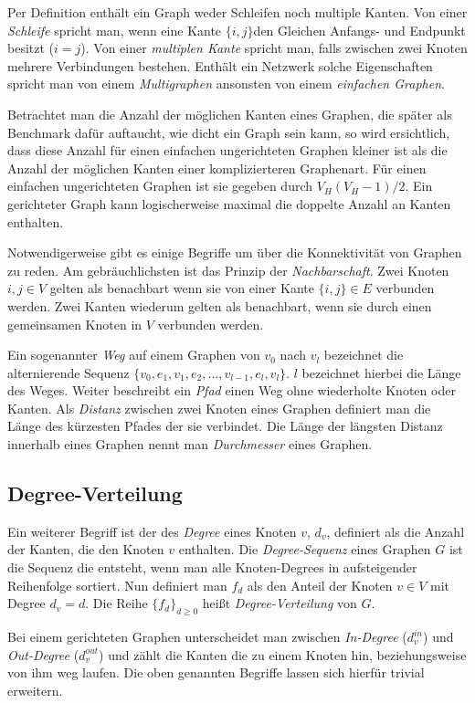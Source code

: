 \documentclass[a4paper,ngerman,oneside,titlepage,bibliography=totoc,11pt]{scrreprt}
\begin{document}
Per Definition enthält ein Graph weder Schleifen noch multiple Kanten. Von einer \emph{Schleife} spricht man, wenn eine Kante $\{i,j\}$den Gleichen Anfangs- und Endpunkt besitzt ($i = j$). Von einer \emph{multiplen Kante} spricht man, falls zwischen zwei Knoten mehrere Verbindungen bestehen. Enthält ein Netzwerk solche Eigenschaften spricht man von einem \emph{Multigraphen} ansonsten von einem \emph{einfachen Graphen}.

Betrachtet man die Anzahl der möglichen Kanten eines Graphen, die später als Benchmark dafür auftaucht, wie dicht ein Graph sein kann, so wird ersichtlich, dass diese Anzahl für einen einfachen ungerichteten Graphen kleiner ist als die Anzahl der möglichen Kanten einer komplizierteren Graphenart. Für einen einfachen ungerichteten Graphen ist sie gegeben durch $V_H(V_H-1)/2$. Ein gerichteter Graph kann logischerweise maximal die doppelte Anzahl an Kanten enthalten.

Notwendigerweise gibt es einige Begriffe um über die Konnektivität von Graphen zu reden. Am gebräuchlichsten ist das Prinzip der \emph{Nachbarschaft}. Zwei Knoten $ i,j \in V$ gelten als benachbart wenn sie von einer Kante $\{i,j\} \in E$ verbunden werden. Zwei Kanten wiederum gelten als benachbart, wenn sie durch einen gemeinsamen Knoten in $V$ verbunden werden.

Ein sogenannter \emph{Weg} auf einem Graphen von $v_0$ nach $v_l$ bezeichnet die alternierende Sequenz $\{v_0, e_1, v_1, e_2, ..., v_{l-1}, e_l, v_l\}$. $l$ bezeichnet hierbei die Länge des Weges. Weiter beschreibt ein \emph{Pfad} einen Weg ohne wiederholte Knoten oder Kanten. Als \emph{Distanz} zwischen zwei Knoten eines Graphen definiert man die Länge des kürzesten Pfades der sie verbindet. Die Länge der längsten Distanz innerhalb eines Graphen nennt man \emph{Durchmesser} eines Graphen.

\subsection{Degree-Verteilung}
Ein weiterer Begriff ist der des \emph{Degree} eines Knoten $v$, $d_v$, definiert als die Anzahl der Kanten, die den Knoten $v$ enthalten. Die \emph{Degree-Sequenz} eines Graphen $G$ ist die Sequenz die entsteht, wenn man alle Knoten-Degrees in aufsteigender Reihenfolge sortiert. Nun definiert man $f_d$ als den Anteil der Knoten $v \in V$ mit Degree $d_v = d$. Die Reihe $\{f_d\}_{d \geq 0}$ heißt \emph{Degree-Verteilung} von $G$. 

Bei einem gerichteten Graphen unterscheidet man zwischen \emph{In-Degree} ($d_v^{in}$) und \emph{Out-Degree} ($d_v^{out}$) und zählt die Kanten die zu einem Knoten hin, beziehungsweise von ihm weg laufen. Die oben genannten Begriffe lassen sich hierfür trivial erweitern.
\end{document}
